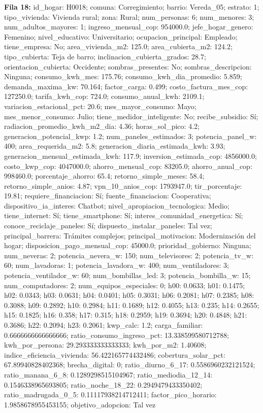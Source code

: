 {\footnotesize\textbf{Fila 18:} id\_hogar: H0018; comuna: Corregimiento; barrio: Vereda\_05; estrato: 1; tipo\_vivienda: Vivienda rural; zona: Rural; num\_personas: 6; num\_menores: 3; num\_adultos\_mayores: 1; ingreso\_mensual\_cop: 954000.0; jefe\_hogar\_genero: Femenino; nivel\_educativo: Universitario; ocupacion\_principal: Empleado; tiene\_empresa: No; area\_vivienda\_m2: 125.0; area\_cubierta\_m2: 124.2; tipo\_cubierta: Teja de barro; inclinacion\_cubierta\_grados: 28.7; orientacion\_cubierta: Occidente; sombras\_presentes: No; sombras\_descripcion: Ninguna; consumo\_kwh\_mes: 175.76; consumo\_kwh\_dia\_promedio: 5.859; demanda\_maxima\_kw: 70.164; factor\_carga: 0.499; costo\_factura\_mes\_cop: 127250.0; tarifa\_kwh\_cop: 724.0; consumo\_anual\_kwh: 2109.1; variacion\_estacional\_pct: 20.6; mes\_mayor\_consumo: Mayo; mes\_menor\_consumo: Julio; tiene\_medidor\_inteligente: No; recibe\_subsidio: Sí; radiacion\_promedio\_kwh\_m2\_dia: 4.36; horas\_sol\_pico: 4.2; generacion\_potencial\_kwp: 1.2; num\_paneles\_estimados: 3; potencia\_panel\_w: 400; area\_requerida\_m2: 5.8; generacion\_diaria\_estimada\_kwh: 3.93; generacion\_mensual\_estimada\_kwh: 117.9; inversion\_estimada\_cop: 4856000.0; costo\_kwp\_cop: 4047000.0; ahorro\_mensual\_cop: 83205.0; ahorro\_anual\_cop: 998460.0; porcentaje\_ahorro: 65.4; retorno\_simple\_meses: 58.4; retorno\_simple\_anios: 4.87; vpn\_10\_anios\_cop: 1793947.0; tir\_porcentaje: 19.81; requiere\_financiacion: Sí; fuente\_financiacion: Cooperativa; dispositivo\_ia\_interes: Chatbot; nivel\_apropiacion\_tecnologica: Medio; tiene\_internet: Sí; tiene\_smartphone: Sí; interes\_comunidad\_energetica: Sí; conoce\_reciclaje\_paneles: Sí; dispuesto\_instalar\_paneles: Tal vez; principal\_barrera: Trámites complejos; principal\_motivacion: Modernización del hogar; disposicion\_pago\_mensual\_cop: 45000.0; prioridad\_gobierno: Ninguna; num\_neveras: 2; potencia\_nevera\_w: 150; num\_televisores: 2; potencia\_tv\_w: 60; num\_lavadoras: 1; potencia\_lavadora\_w: 400; num\_ventiladores: 3; potencia\_ventilador\_w: 60; num\_bombillas\_led: 3; potencia\_bombilla\_w: 15; num\_computadores: 2; num\_equipos\_especiales: 0; h00: 0.0633; h01: 0.1475; h02: 0.0343; h03: 0.0631; h04: 0.0401; h05: 0.3031; h06: 0.2081; h07: 0.2385; h08: 0.3088; h09: 0.2892; h10: 0.2984; h11: 0.1689; h12: 0.4055; h13: 0.235; h14: 0.2655; h15: 0.1825; h16: 0.358; h17: 0.315; h18: 0.2959; h19: 0.3694; h20: 0.4848; h21: 0.3686; h22: 0.2094; h23: 0.2061; kwp\_calc: 1.2; carga\_familiar: 0.6666666666666666; ratio\_consumo\_ingreso\_pct: 13.338599580712788; kwh\_por\_persona: 29.293333333333333; kwh\_por\_m2: 1.40608; indice\_eficiencia\_vivienda: 56.422165774432486; cobertura\_solar\_pct: 67.89940828402368; brecha\_digital: 0; ratio\_diurno\_6\_17: 0.5586960232121524; ratio\_manana\_6\_8: 0.1289298515104967; ratio\_mediodia\_12\_14: 0.1546338965693805; ratio\_noche\_18\_22: 0.2949479433350402; ratio\_madrugada\_0\_5: 0.11117938214712411; factor\_pico\_horario: 1.9858678955453155; objetivo\_adopcion: Tal vez\par}
